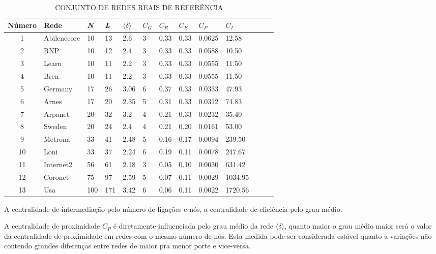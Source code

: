 \documentclass[12pt]{article}
\begin{document}
\begin{table}[htp]
\caption{CONJUNTO DE REDES REAIS DE REFERÊNCIA}\label{tab:tab1}
\centering
\begin{tabular}{cll*{9}{l}r}
\hline\rowcolor{Gray}
Número & Rede & \textit{N} & \textit{L} & $\langle \delta \rangle$ & $C_G$ & $C_R$ & $C_E$ & $C_P$ & $C_I$\\ 
\hline
1   &Abilenecore &10    &13     &2.6    &3   &0.33    &0.33     &0.0625     &12.58\\
2   &RNP        &10     &12     & 2.4   &3   &0.33    &0.33     &0.0588     &10.50\\
3   &Learn      &10     & 11    &2.2    &3   &0.33    &0.33     &0.0555     &11.50\\
4   &Bren       &10     & 11    &2.2    &3   &0.33    &0.33     &0.0555     &11.50\\
5   &Germany    &17     & 26    &3.06   &6   &0.37    &0.33     &0.0333     &47.93\\
6   &Arnes      &17     & 20    &2.35   &5   &0.31    &0.33     &0.0312     &74.83\\
7   &Arpanet    &20     & 32    &3.2    &4   &0.21   &0.33      &0.0232     &35.40\\
8   &Sweden     &20     & 24    &2.4    &4   &0.21   &0.20      &0.0161     &53.00\\
9   &Metrona    &33     & 41    &2.48   &5   &0.16   &0.17      &0.0094     &239.50\\
10  &Loni       &33     & 37    &2.24   & 6  &0.19   &0.11      &0.0078     &247.67\\
11  &Internet2  &56     & 61    &2.18   & 3  &0.05   &0.10      &0.0030     &631.42\\
12  &Coronet    &75     & 97    & 2.59  & 5  &0.07   &0.11      &0.0029     &1034.95\\
13  &Usa        &100    &171    & 3.42  & 6  &0.06    &0.11     &0.0022     &1720.56\\
\hline
\end{tabular}
\end{table}

 A centralidade de intermediação pelo número de ligações e nós, a centralidade de eficiência pelo grau médio.
 
A centralidade de proximidade $C_P$ é diretamente influenciada pelo grau médio da rede $\langle \delta \rangle$, quanto maior o grau médio maior será o valor da centralidade de proximidade em redes com o mesmo número de nós. Esta medida pode ser considerada estável quanto a variações não contendo grandes diferenças entre redes de maior pra menor porte e vice-versa.
\
\end{document}
